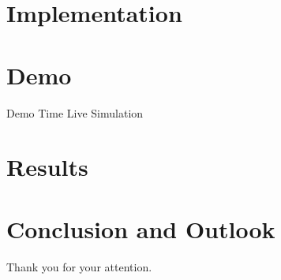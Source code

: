 \documentclass[final]{beamer}
\begin{document}
\section{Implementation}



\section{Demo}

\begin{frame}[t]{Demo Time}{}
  \centering
  \vfill
  {\Huge Live Simulation}
  \vfill
\end{frame}

\section{Results}



\section{Conclusion and Outlook}




\begin{frame}[titleimagenofooter]{}{}
  \centering
  Thank you for your attention.
\end{frame}


\end{document}

